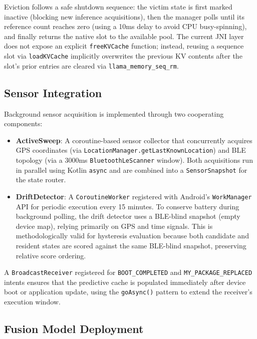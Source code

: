 Eviction follows a safe shutdown sequence: the victim state is first marked inactive (blocking new inference acquisitions), then the manager polls until its reference count reaches zero (using a 10ms delay to avoid CPU busy-spinning), and finally returns the native slot to the available pool. The current JNI layer does not expose an explicit \texttt{freeKVCache} function; instead, reusing a sequence slot via \texttt{loadKVCache} implicitly overwrites the previous KV contents after the slot's prior entries are cleared via \texttt{llama\_memory\_seq\_rm}.

\subsection{Sensor Integration}
\label{sec:sensors}

Background sensor acquisition is implemented through two cooperating components:

\begin{itemize}
    \item \textbf{ActiveSweep}: A coroutine-based sensor collector that concurrently acquires GPS coordinates (via \texttt{LocationManager.getLastKnownLocation}) and BLE topology (via a 3000ms \texttt{BluetoothLeScanner} window). Both acquisitions run in parallel using Kotlin \texttt{async} and are combined into a \texttt{SensorSnapshot} for the state router.

    \item \textbf{DriftDetector}: A \texttt{CoroutineWorker} registered with Android's \texttt{WorkManager} API for periodic execution every 15 minutes. To conserve battery during background polling, the drift detector uses a BLE-blind snapshot (empty device map), relying primarily on GPS and time signals. This is methodologically valid for hysteresis evaluation because both candidate and resident states are scored against the same BLE-blind snapshot, preserving relative score ordering.
\end{itemize}

A \texttt{BroadcastReceiver} registered for \texttt{BOOT\_COMPLETED} and \texttt{MY\_PACKAGE\_REPLACED} intents ensures that the predictive cache is populated immediately after device boot or application update, using the \texttt{goAsync()} pattern to extend the receiver's execution window.

\subsection{Fusion Model Deployment}
\label{sec:fusion_deploy}

